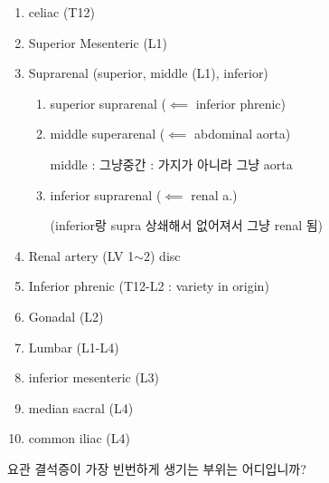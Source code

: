 \documentclass[10pt]{amsart}
\numberwithin{theorem}{section}
\numberwithin{example}{section}
\newenvironment{prob}[1]
  {\renewcommand\theinnercustompro{#1}\innercustompro}
  {\endinnercustompro}
\theoremstyle{definition}
\theoremstyle{remark}
\begin{document}
\begin{enumerate}
\begin{enumerate}
\item  celiac (T12)


\vspace{1.5pt}

\item  Superior Mesenteric (L1)

\item Suprarenal (superior, middle (L1), inferior) 
\begin{enumerate}
    \item superior suprarenal ($\impliedby$ inferior phrenic)
    \item middle superarenal ($\impliedby$ abdominal aorta)
    
    middle : 그냥중간 : 가지가 아니라 그냥 aorta
    \item inferior suprarenal ($\impliedby $ renal a.)
    
    (inferior랑 supra 상쇄해서 없어져서 그냥 renal 됨) 
    
    
\end{enumerate}

    \vspace{1.5pt}
    
    
    \item 
    
    Renal artery (LV 1$\sim$2) disc
    
    \vspace{1.5pt}
    
    
    \item Inferior phrenic  (T12-L2 : variety in origin)
    
\item   Gonadal (L2) 

\item  Lumbar (L1-L4)

\item inferior mesenteric (L3)

\item  median sacral (L4)

\item common iliac (L4) 
    \end{enumerate}
\end{enumerate}

\vspace{2pt}




\newpage
\begin{prob}{1}
\textnormal{요관 결석증이 가장 빈번하게 생기는 부위는 어디입니까?}

\end{prob}
\end{document}
